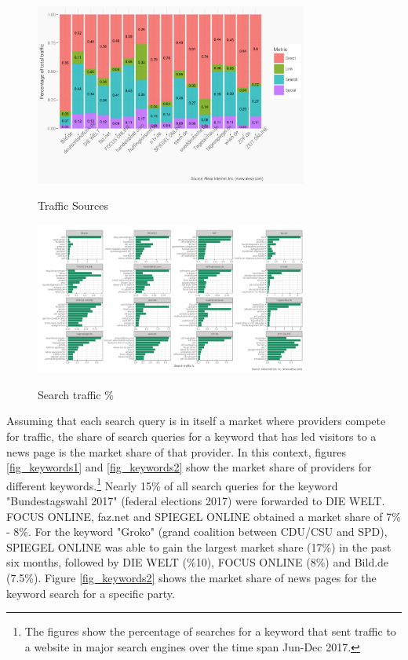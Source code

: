 \documentclass[12pt,a4paper,notitlepage]{article}
\begin{document}
\begin{figure}[H]
	\caption{Traffic Sources}
	\begin{center}
		\includegraphics[width=0.8\textwidth]{../figs/traffic_source.png}
		\label{fig_traffic}
	\end{center}
\end{figure}

\begin{figure}[H]
	\caption{Search traffic \%}
	\begin{center}
		\includegraphics[width=0.8\textwidth]{../figs/search_traffic.png}
		\label{fig_searchtraffic}
	\end{center}
\end{figure}

Assuming that each search query is in itself a market where providers compete for traffic, the share of search queries for a keyword that has led visitors to a news page is the market share of that provider. In this context, figures \ref{fig_keywords1} and \ref{fig_keywords2} show the market share of providers for different keywords.\footnote{The figures show the percentage of searches for a keyword that sent traffic to a website in major search engines over the time span Jun-Dec 2017.} Nearly 15\% of all search queries for the keyword "Bundestagswahl 2017" (federal elections 2017) were forwarded to DIE WELT. FOCUS ONLINE, faz.net and SPIEGEL ONLINE obtained a market share of 7\% - 8\%. For the keyword "Groko" (grand coalition between CDU/CSU and SPD), SPIEGEL ONLINE was able to gain the largest market share (17\%) in the past six months, followed by DIE WELT (\%10), FOCUS ONLINE (8\%) and Bild.de (7.5\%). Figure \ref{fig_keywords2} shows the market share of news pages for the keyword search for a specific party. 
\end{document}
